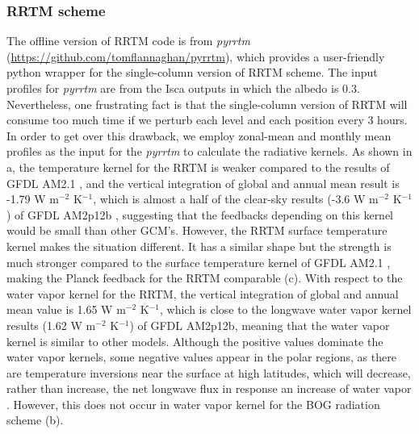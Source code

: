 \subsubsection{RRTM scheme} The offline version of RRTM code is from \textit{pyrrtm} (\url{https://github.com/tomflannaghan/pyrrtm}), which provides a user-friendly python wrapper for the single-column version of RRTM scheme. The input profiles for \textit{pyrrtm} are from the Isca outputs in which the albedo is 0.3. Nevertheless, one frustrating fact is that the single-column version of RRTM will consume too much time if we perturb each level and each position every 3 hours. In order to get over this drawback, we employ zonal-mean and monthly mean profiles as the input for the \textit{pyrrtm} to calculate the radiative kernels. As shown in a, the temperature kernel for the RRTM is weaker compared to the results of GFDL AM2.1 \citep[see their Fig. A1 of][]{Feldl2017coupled}, and the vertical integration of global and annual mean result is -1.79 W m$^{-2}$ K$^{-1}$, which is almost a half of the clear-sky results (-3.6 W m$^{-2}$ K$^{-1}$) of GFDL AM2p12b \citep{Soden2008}, suggesting that the feedbacks depending on this kernel would be small than other GCM's. However, the RRTM surface temperature kernel makes the situation different. It has a similar shape but the strength is much stronger compared to the surface temperature kernel of GFDL AM2.1 \citep[see their Fig. A1 of][]{Feldl2017coupled}, making the Planck feedback for the RRTM comparable (c). With respect to the water vapor kernel for the RRTM, the vertical integration of global and annual mean value is 1.65 W m$^{-2}$ K$^{-1}$, which is close to the longwave water vapor kernel results (1.62 W m$^{-2}$ K$^{-1}$) of GFDL AM2p12b, meaning that the water vapor kernel is similar to other models. Although the positive values dominate the water vapor kernels, some negative values appear in the polar regions, as there are temperature inversions near the surface at high latitudes, which will decrease, rather than increase, the net longwave flux in response an increase of water vapor \citep{Soden2008}. However, this does not occur in water vapor kernel for the BOG radiation scheme (b).


